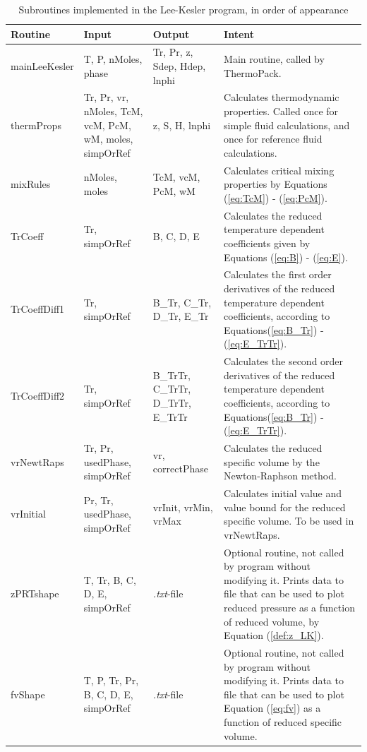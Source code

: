 \documentclass[internal,english]{sintefmemo2012}
\numberwithin{equation}{section}
\newcommand*{\reff}[1]{(\ref{#1})}
\begin{document}
\renewcommand{\arraystretch}{1.2}
\begin{table}[h]
\begin{center}
\caption{Subroutines implemented in the Lee-Kesler program, in order of appearance}
\label{tab:subroutines}
\begin{tabular}{l p{3cm} p{3cm} p{6cm}}
\hline%
Routine & Input & Output  & Intent\\
\hline
mainLeeKesler	& T, P, nMoles, phase & Tr, Pr, z, Sdep, Hdep, lnphi & Main routine, called by ThermoPack. \\
thermProps		& Tr, Pr, vr, nMoles, TcM, vcM, PcM, wM, moles, simpOrRef & z, S, H, lnphi & Calculates thermodynamic properties. Called once for simple fluid calculations, and once for reference fluid calculations. \\
mixRules		& nMoles, moles & TcM, vcM, PcM, wM & Calculates critical mixing properties by Equations \reff{eq:TcM} - \reff{eq:PcM}.	\\
TrCoeff			& Tr, simpOrRef	& B, C, D, E & Calculates the reduced temperature dependent coefficients given by Equations \reff{eq:B} - \reff{eq:E}. \\
TrCoeffDiff1 	& Tr, simpOrRef	& B\_Tr, C\_Tr, D\_Tr, E\_Tr	& Calculates the first order derivatives of the reduced temperature dependent coefficients, according to Equations\reff{eq:B_Tr} - \reff{eq:E_TrTr}. \\
TrCoeffDiff2 	& Tr, simpOrRef	& B\_TrTr, C\_TrTr, D\_TrTr, E\_TrTr	& Calculates the second order derivatives of the reduced temperature dependent coefficients, according to Equations\reff{eq:B_Tr} - \reff{eq:E_TrTr}. \\
vrNewtRaps		& Tr, Pr, usedPhase, simpOrRef	& vr, correctPhase	& Calculates the reduced specific volume by the Newton-Raphson method. \\
vrInitial		&	Pr, Tr, usedPhase, simpOrRef	& vrInit, vrMin, vrMax	& Calculates initial value and value bound for the reduced specific volume. To be used in vrNewtRaps. \\
zPRTshape		& T, Tr, B, C, D, E, simpOrRef & \textit{.txt}-file	& Optional routine, not called by program without modifying it. Prints data to file that can be used to plot reduced pressure as a function of reduced volume, by Equation \reff{def:z_LK}. \\
fvShape			& T, P, Tr, Pr, B, C, D, E, simpOrRef & \textit{.txt}-file & Optional routine, not called by program without modifying it. Prints data to file that can be used to plot Equation \reff{eq:fv} as a function of reduced specific volume. \\
\hline
\end{tabular}
\end{center}
\end{table}
\end{document}
